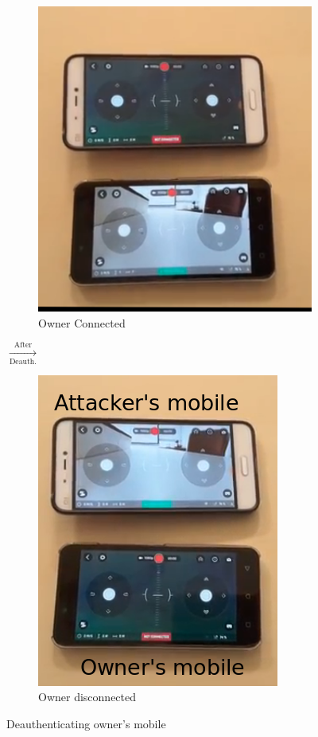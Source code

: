 \documentclass[conference]{IEEEtran}
\begin{document}
\begin{figure}[!hbt]
	\centering
	\begin{subfigure}{.2\textwidth}
		\centering
		\includegraphics[width=0.85\columnwidth]{disconnec1}
		\caption{Owner Connected}
	\end{subfigure}$\xrightarrow[\text{Deauth.}]{\text{After}}$
	\begin{subfigure}{.2\textwidth}
		\centering
		\includegraphics[width=0.85\columnwidth]{disconn2}
		\caption{Owner disconnected}
	\end{subfigure}
	\caption{Deauthenticating owner's mobile}
	\label{fig:disconnect}
\end{figure}
\end{document}
